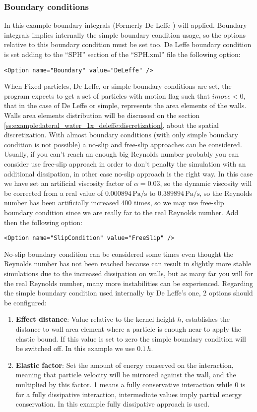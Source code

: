 \subsubsection{Boundary conditions}
\label{sss:example:lateral_water_1x_deleffe:BC}
%
In this example boundary integrals (Formerly De Leffe \citep{deleffe_etal_spheric09}) will applied. Boundary
integrals implies internally the simple boundary condition usage, so the options relative to this boundary condition
must be set too. De Leffe boundary condition is set adding to the ``SPH'' section of the ``SPH.xml'' file the
following option:
%
\begin{verbatim}
<Option name="Boundary" value="DeLeffe" />
\end{verbatim}
%
When Fixed particles, De Leffe, or simple boundary conditions are set, the program expects to get a set of particles
with motion flag such that $imove < 0$, that in the case of De Leffe or simple, represents the area elements of the
walls. Walls area elements distribution will be discussed on the section
\ref{ss:example:lateral_water_1x_deleffe:discretization}, about the spatial discretization.
%
With almost boundary conditions (with only simple boundary condition is not possible) a no-slip and free-slip
approaches can be considered. Usually, if you can't reach an enough big Reynolds number probably you can consider
use free-slip approach in order to don't penalty the simulation with an additional dissipation, in other case
no-slip approach is the right way. In this case we have set an artificial viscosity factor of $\alpha = 0.03$, so
the dynamic viscosity will be corrected from a real value of $0.000894 \, \mbox{Pa/s}$ to
$0.389894 \, \mbox{Pa/s}$, so the Reynolds number has been artificially increased 400 times, so we may use free-slip
boundary condition since we are really far to the real Reynolds number. Add then the following option:
%
\begin{verbatim}
<Option name="SlipCondition" value="FreeSlip" />
\end{verbatim}
%
No-slip boundary condition can be considered some times even thought the Reynolds number has not been reached
because can result in slightly more stable simulations due to the increased dissipation on walls, but as many
far you will for the real Reynolds number, many more instabilities can be experienced.\rc
%
Regarding the simple boundary condition used internally by De Leffe's one, 2 options should be configured:
%
\begin{enumerate}
	\item \textbf{Effect distance}: Value relative to the kernel height $h$, establishes the distance to wall area
	element where a particle is enough near to apply the elastic bound. If this value is set to zero the simple
	boundary condition will be switched off. In this example we use $0.1 \, h$.
	\item \textbf{Elastic factor}: Set the amount of energy conserved on the interaction, meaning that particle
	velocity will be mirrored against the wall, and the multiplied by this factor. 1 means a fully conservative
	interaction while 0 is for a fully dissipative interaction, intermediate values imply partial energy
	conservation. In this example fully dissipative approach is used.
\end{enumerate}
